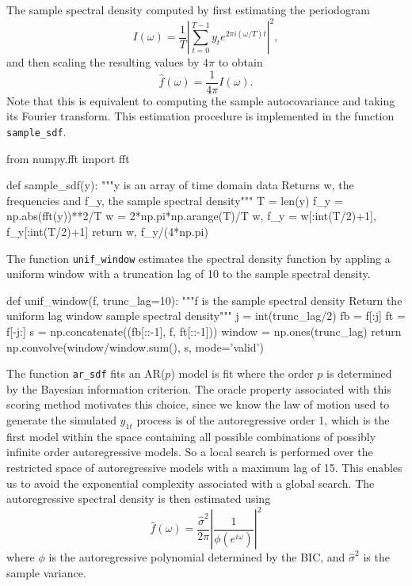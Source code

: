 \documentclass[oneside, a4paper]{amsart}
\begin{document}
The sample spectral density computed by first estimating the periodogram 
\[
	I(\omega) = \frac{1}{T} \left| \sum_{t=0}^{T-1} y_t e^{2\pi i (\omega/T)t} \right|^2,
\]
and then scaling the resulting values by $4\pi$ to obtain
\[
	\hat f(\omega) =  \frac{1}{4\pi} I(\omega).
\]
Note that this is equivalent to computing the sample autocovariance and taking its Fourier transform. This estimation procedure is implemented in the function \texttt{sample_sdf}. 
\begin{python3code}
from numpy.fft import fft

def sample_sdf(y):
    """y is an array of time domain data 
    Returns w, the frequencies and f_y, the sample spectral density"""
    T = len(y)
    f_y = np.abs(fft(y))**2/T
    w = 2*np.pi*np.arange(T)/T
    w, f_y = w[:int(T/2)+1], f_y[:int(T/2)+1]
    return w, f_y/(4*np.pi)
\end{python3code}    
The function \texttt{unif_window} estimates the spectral density function by appling a uniform window with a truncation lag of 10 to the sample spectral density.  
\begin{python3code}              
def unif_window(f, trunc_lag=10):
    """f is the sample spectral density
    Return the uniform lag window sample spectral density"""
    j = int(trunc_lag/2)
    fb = f[:j]
    ft = f[-j:]
    s = np.concatenate((fb[::-1], f, ft[::-1]))
    window = np.ones(trunc_lag)
    return np.convolve(window/window.sum(), s, mode='valid')
\end{python3code}    
The function \texttt{ar_sdf} fits an AR($p$) model is fit where the order $p$ is determined by the Bayesian information criterion. The oracle property associated with this scoring method motivates this choice, since we know the law of motion used to generate the simulated $y_{1t}$ process is of the autoregressive order 1, which is the first model within the space containing all possible combinations of possibly infinite order autoregressive models. So a local search is performed over the restricted space of autoregressive models with a maximum lag of 15. This enables us to avoid the exponential complexity associated with a global search. The autoregressive spectral density is then estimated using 
\[
	\hat f(\omega) = \frac{\hat\sigma^2}{2\pi} \left| \frac{1}{\phi(e^{i\omega})} \right|^2 
\]
where $\phi$ is the autoregressive polynomial determined by the BIC, and $\hat \sigma^2$ is the sample variance.
\end{document}
